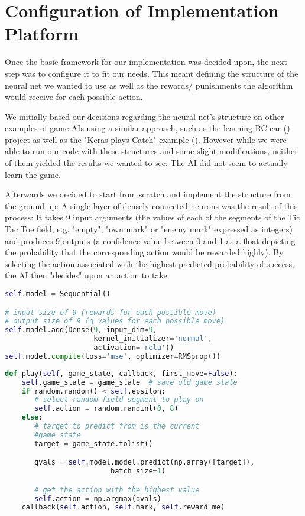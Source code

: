 \section{Configuration of Implementation Platform}

Once the basic framework for our implementation was decided upon, the next step was to configure it to fit our needs. This meant defining the structure of the neural net we wanted to use as well as the rewards/ punishments the algorithm would receive for each possible action.

We initially based our decisions regarding the neural net's structure on other examples of game AIs using a similar approach, such as the learning RC-car (\cite{Harvey2017}) project as well as the "Keras plays Catch" example (\cite{Santana17}). However while we were able to run our code with these structures and some slight modifications, neither of them yielded the results we wanted to see: The AI did not seem to actually learn the game.

Afterwards we decided to start from scratch and implement the structure from the ground up: A single layer of densely connected neurons was the result of this process: It takes 9 input arguments (the values of each of the segments of the Tic Tac Toe field, e.g. "empty", "own mark" or "enemy mark" expressed as integers) and produces 9 outputs (a confidence value between 0 and 1 as a float depicting the probability that the corresponding action would be rewarded highly). By selecting the action associated with the highest predicted probability of success, the AI then "decides" upon an action to take.
\begin{lstlisting}[frame=single,language=Python,caption={Implementation of our neural network},captionpos=b]
self.model = Sequential()

# input size of 9 (rewards for each possible move)
# output size of 9 (q values for each possible move)
self.model.add(Dense(9, input_dim=9,
                     kernel_initializer='normal',
                     activation='relu'))
self.model.compile(loss='mse', optimizer=RMSprop())
\end{lstlisting}

\begin{lstlisting}[frame=single,language=Python,caption={Method of },captionpos=b]
def play(self, game_state, callback, first_move=False):             
    self.game_state = game_state  # save old game state
    if random.random() < self.epsilon:
       # select random field segment to play on
       self.action = random.randint(0, 8)
    else:
       # target to predict from is the current 
       #game state
       target = game_state.tolist()

       qvals = self.model.model.predict(np.array([target]),
       					 batch_size=1)

       # get the action with the highest value
       self.action = np.argmax(qvals)
    callback(self.action, self.mark, self.reward_me)
\end{lstlisting}

